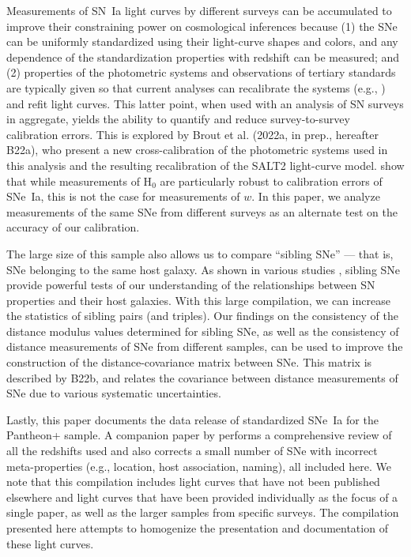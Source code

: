\documentclass[twocolumn]{aastex63}
\begin{document}
Measurements of SN~Ia light curves by different surveys can be accumulated to improve their constraining power on cosmological inferences because (1) the SNe can be uniformly standardized using their light-curve shapes and colors, and any dependence of the standardization properties with redshift can be measured; and (2) properties of the photometric systems and observations of tertiary standards are typically given so that current analyses can recalibrate the systems (e.g., \citealp{Scolnic2015, Currie20}) and refit light curves.  This latter point, when used with an analysis of SN surveys in aggregate, yields the ability to quantify and reduce survey-to-survey calibration errors.  This is explored by Brout et al. (2022a, in prep., hereafter B22a), who present a new cross-calibration of the photometric systems used in this analysis and the resulting recalibration of the SALT2 light-curve model.  \cite{Brownsberger21} show that while measurements of H$_0$ are particularly robust to calibration errors of SNe~Ia, this is not the case for measurements of $w$.  In this paper, we analyze measurements of the same SNe from different surveys as an alternate test on the accuracy of our calibration.

The large size of this sample also allows us to compare ``sibling SNe'' --- that is, SNe belonging to the same host galaxy.  As shown in various studies \citep{Scolnic20,Burns20,Biswas21}, sibling SNe provide powerful tests of our understanding of the relationships between SN properties and their host galaxies.  With this large compilation, we can increase the statistics of sibling pairs (and triples).  Our findings on the consistency of the distance modulus values determined for sibling SNe, as well as the consistency of distance measurements of SNe from different samples, can be used to improve the construction of the distance-covariance matrix between SNe.  This matrix is described by B22b, and relates the covariance between distance measurements of SNe due to various systematic uncertainties.

Lastly, this paper documents the data release of standardized SNe~Ia for the Pantheon+ sample.  A companion paper by \cite[][hereafter C22]{carr2021pantheon} performs a comprehensive review of all the redshifts used and also corrects a small number of SNe with incorrect meta-properties (e.g., location, host association, naming),  all included here.  We note that this compilation includes light curves that have not been published elsewhere and light curves that have been provided individually as the focus of a single paper, as well as the larger samples from specific surveys. The compilation presented here attempts to homogenize the presentation and documentation of these light curves. 
\end{document}
